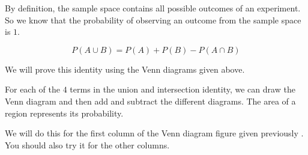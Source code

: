 By definition, the sample space contains all possible outcomes of an
experiment. So we know that the probability of observing an outcome
from the sample space is $1$.

\begin{equation*}
 P(A \cup B) = P(A) + P(B) - P(A \cap B)
\end{equation*}


We will prove this identity using the Venn diagrams given above.

For each of the $4$ terms in the
union and intersection identity, we can draw the Venn diagram and then
add and subtract the different diagrams. The area of a region
represents its probability.

We will do this for the first column of the Venn diagram figure given previously%
. You should also try it for the
other columns.

